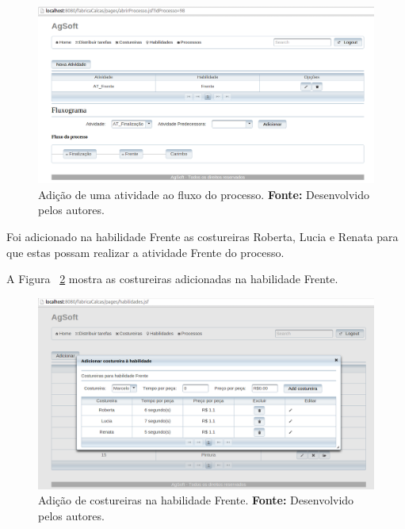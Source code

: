 \begin{figure}[h!]
	\centerline{\includegraphics[scale=0.3]{./imagens/adicionar_atividade_frente_teste4.png}}
	\caption[Adição de uma atividade ao fluxo do processo.]
	{Adição de uma atividade ao fluxo do processo. \textbf{Fonte:} Desenvolvido
	pelos autores.}
	\label{fig:add_frente_teste4}
\end{figure}


\par Foi adicionado na habilidade Frente as costureiras Roberta, Lucia e Renata
para que estas possam realizar a atividade Frente do processo.
\par A Figura ~\ref{fig:add_costureira_frente_teste4} mostra as costureiras
adicionadas na habilidade Frente.

\newpage

\begin{figure}[h!]
	\centerline{\includegraphics[scale=0.3]{./imagens/costureiras_at_frente_tete5.png}}
	\caption[Adição de costureiras na habilidade Frente.]
	{Adição de costureiras na habilidade Frente. \textbf{Fonte:} Desenvolvido pelos
	autores.}
	\label{fig:add_costureira_frente_teste4}
\end{figure}

